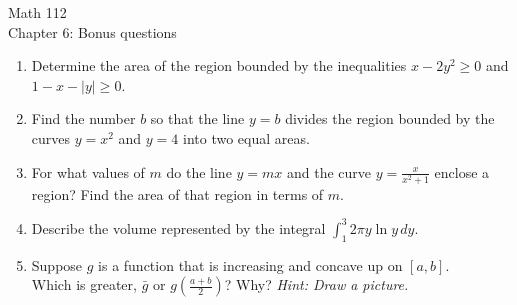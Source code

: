 \documentclass[11pt]{article}
\begin{document}
\begin{center}
\Large
\rm{Math 112}
\\
\rm{Chapter 6:  Bonus questions}
\\
\vspace{0.2in}

\end{center}


  \begin{enumerate}

  \item{Determine the area of the region bounded by the inequalities $x-2y^2\ge 0$ and $1-x-|y|\ge 0$.}
  \item{Find the number $b$ so that the line $y=b$ divides the region bounded by the curves $y=x^2$ and $y=4$ into
    two equal areas.}
  \item{For what values of $m$ do the line $y=mx$ and the curve $y=\frac{x}{x^2+1}$ enclose a region?  Find the area
    of that region in terms of $m$.}
    

  \item{Describe the volume represented by the integral $\int_1^3 2\pi y\ln{y} \, dy$.}

  \item{Suppose $g$ is a function that is increasing and concave up on $[a,b]$. \\ Which is greater, $\bar{g}$ or $g\left(\frac{a+b}{2}\right)$?  Why? 
  \emph{Hint: Draw a picture.}  }

      \end{enumerate}
\end{document}
